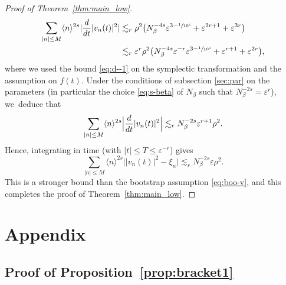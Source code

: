 \documentclass[10pt,a4paper]{amsart}
\theoremstyle{plain}
\theoremstyle{definition}
\newcommand{\1}{\mathbf{1}}
\let\epsilon\varepsilon
\providecommand{\Subsection}{\subsection}
\begin{document}
\begin{proof}[Proof of Theorem~\ref{thm:main_low}]
\begin{align*}
\sum_{|n|\leq M}\langle n\rangle^{2s}|\frac{d}{dt}|v_{n}(t)|^{2}|
&\lesssim_{r}
\rho^{2}
\big(
N_{\beta}^{-4s}\epsilon^{3-\sfrac{1}{10^{4}}}
+
\epsilon^{2r+1}
+\epsilon^{3r}
\big) \\
&\lesssim_{r}
\epsilon^{r}\rho^{2}
\big(
N_{\beta}^{-4s}\epsilon^{-r}\epsilon^{3-\sfrac{1}{10^{4}}}+\epsilon^{r+1} + \epsilon^{2r}
\big),
\end{align*}
where we used the bound \eqref{eq:d--1} on the symplectic transformation and the assumption on $f(t)$. Under the conditions of subsection \eqref{sec:par} on the parameters (in particular the choice \eqref{eq:s-beta} of $N_{\beta}$ such that $N_{\beta}^{-2s}=\epsilon^{r}$), we~deduce that
\[
\sum_{|n|\leq M}\langle n\rangle^{2s}\Bigl|\frac{d}{dt}|v_{n}(t)|^{2}\Bigr|
\lesssim_{r} N_{\beta}^{-2s}\epsilon^{r+1}\rho^{2}.
\]
Hence, integrating in time (with $|t|\leq T\leq \epsilon^{-r}$) gives
\[
\sum_{|n|\leq M}\langle n\rangle^{2s}\bigl||v_{n}(t)|^{2}-\xi_{n}\bigr|
\lesssim_{r} N_{\beta}^{-2s}\epsilon\rho^{2}.
\]
This is a stronger bound than the bootstrap assumption \eqref{eq:boo-v}, and this completes the proof of Theorem~\ref{thm:main_low}.
\end{proof}

\appendix{}
\section*{Appendix}

\Subsection{Proof of Proposition~\ref{prop:bracket1}}
\label{app-lp}
\end{document}
